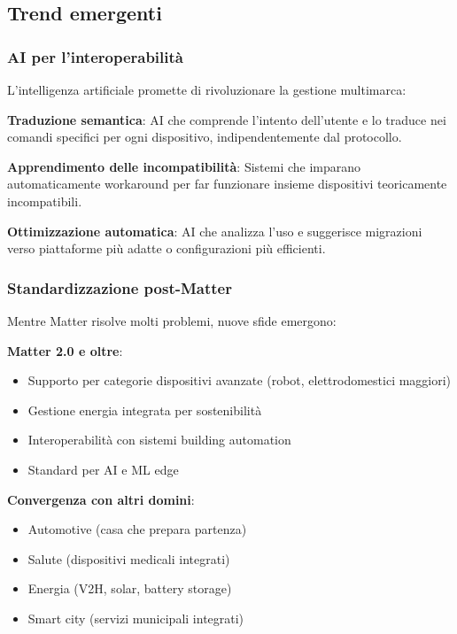 \subsection{Trend emergenti}

\subsubsection{AI per l'interoperabilità}

L'intelligenza artificiale promette di rivoluzionare la gestione multimarca:

\textbf{Traduzione semantica}: AI che comprende l'intento dell'utente e lo traduce nei comandi specifici per ogni dispositivo, indipendentemente dal protocollo.

\textbf{Apprendimento delle incompatibilità}: Sistemi che imparano automaticamente workaround per far funzionare insieme dispositivi teoricamente incompatibili.

\textbf{Ottimizzazione automatica}: AI che analizza l'uso e suggerisce migrazioni verso piattaforme più adatte o configurazioni più efficienti.

\subsubsection{Standardizzazione post-Matter}

Mentre Matter risolve molti problemi, nuove sfide emergono:

\textbf{Matter 2.0 e oltre}:
\begin{itemize}
    \item Supporto per categorie dispositivi avanzate (robot, elettrodomestici maggiori)
    \item Gestione energia integrata per sostenibilità
    \item Interoperabilità con sistemi building automation
    \item Standard per AI e ML edge
\end{itemize}

\textbf{Convergenza con altri domini}:
\begin{itemize}
    \item Automotive (casa che prepara partenza)
    \item Salute (dispositivi medicali integrati)
    \item Energia (V2H, solar, battery storage)
    \item Smart city (servizi municipali integrati)
\end{itemize}

